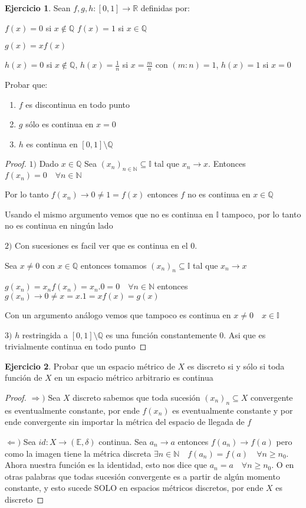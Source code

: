 \documentclass[12pt]{article}
\newcommand{\Q}{\mathbb{Q}}
\newcommand{\R}{\mathbb{R}}
\newcommand{\E}{\mathbb{E}}
\newcommand{\I}{\mathbb{I}}
\newcommand{\N}{\mathbb{N}}
\newcommand{\Ra}{\Rightarrow}
\newcommand{\ra}{\rightarrow}
\theoremstyle{definition}
\newtheorem{ej}{Ejercicio}
\begin{document}
\begin{ej}
  Sean $f,g,h:[0,1] \ra \R$ definidas por:

 $f(x) = 0 $ si $ x\notin \Q$ $f(x) = 1$ si $x \in \Q$ 

 $g(x) = xf(x)$
 
 $h(x) = 0$ si $x \notin \Q$, $h(x) = \frac{1}{n}$ si $x = \frac{m}{n}$ con $(m:n ) = 1$, $h(x) = 1$ si $x=0$

 Probar que:
 \begin{enumerate}
   \item $f$ es discontinua en todo punto
   \item $g$ sólo es continua en $x =0$
   \item $h$ es continua en $[0,1] \setminus \Q$
 \end{enumerate}
 \begin{proof}
 $1)$ Dado $x \in \Q$ Sea $(x_n)_{n \in \N} \subseteq \I$ tal que $x_n \ra x$. Entonces $f(x_n) = 0 \quad \forall n \in \N$

 Por lo tanto $f(x_n) \ra 0 \neq 1 = f(x) $ entonces $f$ no es continua en $x \in \Q$

 Usando el mismo argumento vemos que no es continua en $\I$ tampoco, por lo tanto no es continua en ningún lado

 $2)$  Con sucesiones es facil ver que es continua en el 0. 

 Sea $x \neq 0$ con $x \in \Q$ entonces tomamos $(x_n)_n \subseteq \I $ tal que $x_n \ra x$

 $g(x_n) = x_nf(x_n)= x_n.0 = 0 \quad \forall n \in \N $ entonces  $g(x_n) \ra 0 \neq x = x.1 = xf(x) = g(x)$

 Con un argumento análogo vemos que tampoco es continua en $x\neq 0 \quad x\in \I$

 $3)$ $h$ restringida a $[0,1] \setminus \Q$ es una función constantemente 0. Asi que es trivialmente continua en todo punto
 \end{proof}
 \end{ej}
 
 \begin{ej}
   Probar que un espacio métrico de $X$ es discreto si y sólo si toda función de $X$ en un espacio métrico arbitrario es continua
   \begin{proof}
   $\Ra ) $ Sea $X$ discreto sabemos que toda sucesión $(x_n)_n \subseteq X$ convergente es eventualmente constante, por ende $f(x_n)$ es eventualmente constante y por ende convergente sin importar la métrica del espacio de llegada de $f$

 $\Leftarrow )$ Sea $id: X \ra (\E,\delta)$ continua. Sea $a_n \ra a$ entonces $f(a_n) \ra f(a)$ pero como la imagen tiene la métrica discreta $\exists n \in \N \quad f(a_n) = f(a) \quad \forall n \geq n_0$. Ahora nuestra función es la identidad, esto nos dice que $a_n = a \quad \forall n \geq n_0$. O en otras palabras que todas sucesión convergente es a partir de algún momento constante, y esto sucede SOLO en espacios métricos discretos, por ende $X$ es discreto
   \end{proof}
 \end{ej}
\end{document}
